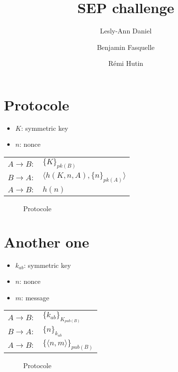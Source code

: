 \documentclass[10pt,a4paper]{article}
\author{Lesly-Ann Daniel \and Benjamin Fasquelle \and Rémi Hutin}
\title{SEP challenge}
\begin{document}
\maketitle


\section{Protocole}

\begin{itemize}
\item $K$: symmetric key
\item $n$: nonce
\end{itemize}

\begin{table}[!h]
\centering
\begin{tabular}{ll}
$A \rightarrow B:$ & $\{K\}_{pk(B)}$ \\
$B \rightarrow A:$ & $\langle h(K, n, A), \{n\}_{pk(A)} \rangle $\\
$A \rightarrow B:$ & $h(n)$\\
\end{tabular}
\end{table}


\begin{figure}[!ht]
\centering
\begin{msc}{Protocole}
  \nextlevel
  \nextlevel
  \nextlevel
  \nextlevel
\end{msc}
\end{figure}




\clearpage
\section{Another one}

\begin{itemize}
\item $k_{ab}$: symmetric key
\item $n$: nonce
\item $m$: message
\end{itemize}



\begin{table}[!h]
\centering
\begin{tabular}{ll}
$A \rightarrow B:$ & $\{k_{ab}\}_{K_{pub(B)}}$ \\
$B \rightarrow A:$ & $\{n\}_{k_{ab}}$ \\
$A \rightarrow B:$ & $\{ \langle n, m \rangle \}_{pub(B)}$
\end{tabular}
\end{table}


\begin{figure}[!ht]
\centering
\begin{msc}{Protocole}
  \nextlevel
  \nextlevel
  \nextlevel
  \nextlevel
\end{msc}
\end{figure}
\end{document}
